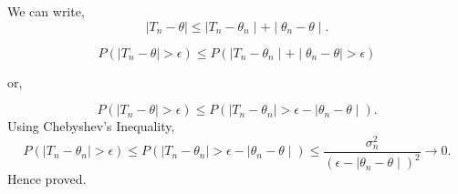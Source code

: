 \documentclass[a4paper]{article}
\begin{document}
We can write, 
\[
		  \mid T_n - \theta  \mid \le\mid T_n - \theta_n  \mid  + \mid \theta_n - \theta \mid  
.\] 

\[
	P\left( \mid T_n - \theta  \mid > \epsilon \right) \le P \left(  \mid T_n - \theta_n \mid  +  \mid \theta_n - \theta  \mid > \epsilon \right) 
\]

or,

\[
	P \left(  \mid T_n -  \theta \mid > \epsilon \right) \le P\left(  \mid T_n - \theta_n  \mid > \epsilon -  \mid \theta_n - \theta  \mid   \right)  
.\] 
Using Chebyshev's Inequality,
\[
	P \left( \mid T_n - \theta_n    \mid > \epsilon \right) \le  P\left(  \mid T_n - \theta_n  \mid > \epsilon -  \mid \theta_n - \theta  \mid   \right) \le \frac{\sigma^2_n}{ (\epsilon - \mid \theta_n - \theta \mid)^2 } \to 0
.\] 
Hence proved.
\end{document}
